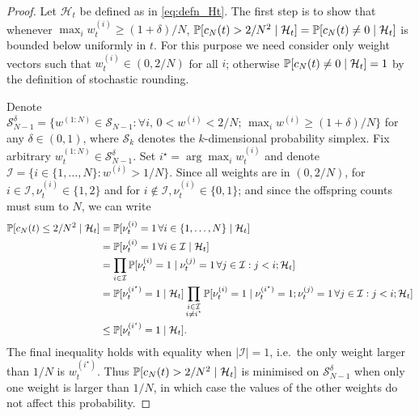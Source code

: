 \begin{proof}
Let $\mathcal{H}_t$ be defined as in \eqref{eq:defn_Ht}. The first step is to show that whenever $\max_i w_t^{(i)} \geq (1+\delta)/N$, $\mathbb{P}[  c_N(t) > 2/N^2 \mid \mathcal{H}_t ] = \mathbb{P}[ c_N(t) \neq 0 \mid \mathcal{H}_t ]$ is bounded below uniformly in $t$.
For this purpose we need consider only weight vectors such that $w_t^{(i)} \in (0,2/N)$ for all $i$; otherwise $\mathbb{P}[ c_N(t) \neq 0 \mid \mathcal{H}_t ] =1$ by the definition of stochastic rounding.

Denote $\mathcal{S}_{N-1}^\delta = \{ w^{(1:N)} \in \mathcal{S}_{N-1} :  \forall i, \, 0 <w^{(i)} <2/N ;\, \max_i w^{(i)} \geq (1 + \delta)/N \}$ for any $\delta \in (0, 1)$, where $\mathcal{S}_{k}$ denotes the $k$-dimensional probability simplex.
Fix arbitrary $w_t^{(1:N)} \in \mathcal{S}_{N-1}^\delta$. Set $i^\star = \arg\max_i w_t^{(i)}$ and denote $\mathcal{I} = \{i \in \{1,\dots,N\} : w^{(i)} > 1/N \}$.
Since all weights are in $(0, 2/N)$, for $i \in \mathcal{I}, \nu_t^{(i)} \in \{1,2\}$ and for $i \notin \mathcal{I}, \nu_t^{(i)} \in \{0,1\}$; and since the offspring counts must sum to $N$, we can write
\begin{align}\label{eq:smallcN_istar}
\mathbb{P}[ c_N(t) \leq 2/N^2 \mid \mathcal{H}_t ]
&= \mathbb{P}[ \nu_t^{(i)} =1 \,\forall i\in\{1,\dots,N\} \mid \mathcal{H}_t ] \notag\\
&= \mathbb{P}[ \nu_t^{(i)} =1 \,\forall i\in \mathcal{I} \mid \mathcal{H}_t ] \notag\\
&= \prod_{i \in \mathcal{I}} \mathbb{P}[ \nu_t^{(i)} =1 \mid \nu_t^{(j)}=1 \,\forall j \in \mathcal{I}: j<i; \mathcal{H}_t ] \notag\\
&= \mathbb{P}[ \nu_t^{(i^\star)} =1 \mid \mathcal{H}_t ] \prod_{\substack{i \in \mathcal{I} \\ i \neq i^\star}} \mathbb{P}[ \nu_t^{(i)} =1 \mid \nu_t^{(i^\star)}=1; \nu_t^{(j)}=1 \,\forall j \in \mathcal{I}: j<i ; \mathcal{H}_t ] \notag\\
&\leq \mathbb{P}[ \nu_t^{(i^\star)} =1 \mid \mathcal{H}_t ] .
\end{align}
The final inequality holds with equality when $|\mathcal{I}| =1$, i.e.\ the only weight larger than $1/N$ is $w_t^{(i^\star)}$.
Thus $\mathbb{P}[ c_N(t) > 2/N^2 \mid \mathcal{H}_t ]$ is minimised on $\mathcal{S}_{N-1}^\delta$ when only one weight is larger than $1/N$, in which case the values of the other weights do not affect this probability. 


\end{proof}
